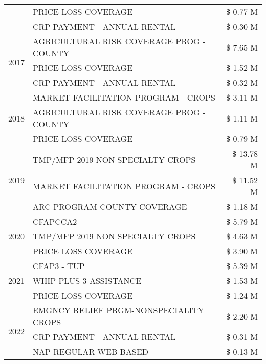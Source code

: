 \begin{tabular}{llr}
 & PRICE LOSS COVERAGE & \$ 0.77 M \\
 & CRP PAYMENT - ANNUAL RENTAL & \$ 0.30 M \\
\cline{1-3}
\multirow[t]{3}{*}{2017} & AGRICULTURAL RISK COVERAGE PROG - COUNTY & \$ 7.65 M \\
 & PRICE LOSS COVERAGE & \$ 1.52 M \\
 & CRP PAYMENT - ANNUAL RENTAL & \$ 0.32 M \\
\cline{1-3}
\multirow[t]{3}{*}{2018} & MARKET FACILITATION PROGRAM - CROPS & \$ 3.11 M \\
 & AGRICULTURAL RISK COVERAGE PROG - COUNTY & \$ 1.11 M \\
 & PRICE LOSS COVERAGE & \$ 0.79 M \\
\cline{1-3}
\multirow[t]{3}{*}{2019} & TMP/MFP 2019 NON SPECIALTY CROPS & \$ 13.78 M \\
 & MARKET FACILITATION PROGRAM - CROPS & \$ 11.52 M \\
 & ARC PROGRAM-COUNTY COVERAGE & \$ 1.18 M \\
\cline{1-3}
\multirow[t]{3}{*}{2020} & CFAPCCA2 & \$ 5.79 M \\
 & TMP/MFP 2019 NON SPECIALTY CROPS & \$ 4.63 M \\
 & PRICE LOSS COVERAGE & \$ 3.90 M \\
\cline{1-3}
\multirow[t]{3}{*}{2021} & CFAP3 - TUP & \$ 5.39 M \\
 & WHIP PLUS 3 ASSISTANCE & \$ 1.53 M \\
 & PRICE LOSS COVERAGE & \$ 1.24 M \\
\cline{1-3}
\multirow[t]{3}{*}{2022} & EMGNCY RELIEF PRGM-NONSPECIALITY CROPS & \$ 2.20 M \\
 & CRP PAYMENT - ANNUAL RENTAL & \$ 0.31 M \\
 & NAP REGULAR WEB-BASED & \$ 0.13 M \\
\cline{1-3}
\bottomrule
\end{tabular}
